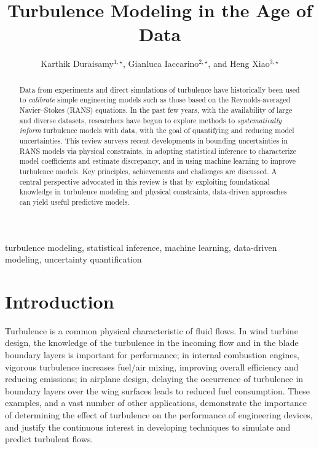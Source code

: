 \documentclass[a4paper]{ar-1col}
\begin{document}

\title{Turbulence Modeling in the Age of Data}

\author{Karthik Duraisamy$^{1, \star}$, Gianluca Iaccarino$^{2, \star}$, and Heng Xiao$^{3, \star}$
}


\begin{abstract}
Data from experiments and direct simulations of turbulence have historically been used to {\em calibrate}  simple engineering models such as those based on the Reynolds-averaged Navier--Stokes (RANS) equations. In the past few years, with the availability of large and diverse datasets, researchers have begun to explore methods to {\em systematically inform} turbulence models with data,
with the goal of quantifying and reducing model uncertainties. This review surveys recent developments in bounding uncertainties in  RANS models via physical constraints, in adopting statistical inference to characterize model coefficients and estimate discrepancy, and in using machine learning to improve turbulence models. Key principles, achievements and challenges are discussed. A central perspective advocated in this review is that by exploiting foundational knowledge in turbulence modeling and physical constraints, data-driven approaches can yield useful predictive models.
\end{abstract}

\begin{keywords}
turbulence modeling, statistical inference, machine learning, data-driven modeling, uncertainty quantification 
\end{keywords}
\maketitle


\section{Introduction}

Turbulence is a common physical characteristic of fluid flows. In wind turbine design, the knowledge of the turbulence 
 in the incoming flow and in the blade boundary layers is important for performance; in internal combustion engines, vigorous 
turbulence increases fuel/air mixing, improving overall efficiency and reducing emissions; in airplane design, delaying the 
occurrence of turbulence in  boundary layers over the wing surfaces leads to reduced  fuel consumption. 
These examples, and a vast number of other applications, demonstrate the importance of determining the effect of turbulence 
on the performance of engineering devices, and justify the continuous interest in developing techniques to simulate and 
predict turbulent flows.
\end{document}
